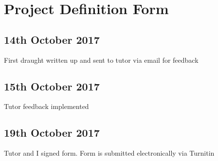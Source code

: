 \section{Project Definition Form}

\subsection{14th October 2017}

First draught written up and sent to tutor via email for feedback

\subsection{15th October 2017}

Tutor feedback implemented

\subsection{19th October 2017}

Tutor and I signed form. Form is submitted electronically via Turnitin
